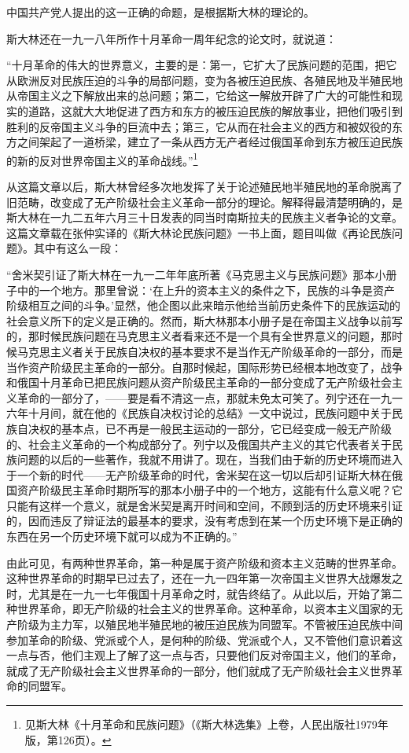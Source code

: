 \documentclass[UTF8, 12pt, a4paper]{ctexrep}
\begin{document}
中国共产党人提出的这一正确的命题，是根据斯大林的理论的。

斯大林还在一九一八年所作十月革命一周年纪念的论文时，就说道：

“十月革命的伟大的世界意义，主要的是：第一，它扩大了民族问题的范围，把它从欧洲反对民族压迫的斗争的局部问题，变为各被压迫民族、各殖民地及半殖民地从帝国主义之下解放出来的总问题；第二，它给这一解放开辟了广大的可能性和现实的道路，这就大大地促进了西方和东方的被压迫民族的解放事业，把他们吸引到胜利的反帝国主义斗争的巨流中去；第三，它从而在社会主义的西方和被奴役的东方之间架起了一道桥梁，建立了一条从西方无产者经过俄国革命到东方被压迫民族的新的反对世界帝国主义的革命战线。”\footnote{见斯大林《十月革命和民族问题》（《斯大林选集》上卷，人民出版社1979年版，第126页）。}

从这篇文章以后，斯大林曾经多次地发挥了关于论述殖民地半殖民地的革命脱离了旧范畴，改变成了无产阶级社会主义革命一部分的理论。解释得最清楚明确的，是斯大林在一九二五年六月三十日发表的同当时南斯拉夫的民族主义者争论的文章。这篇文章载在张仲实译的《斯大林论民族问题》一书上面，题目叫做《再论民族问题》。其中有这么一段：

“舍米契引证了斯大林在一九一二年年底所著《马克思主义与民族问题》那本小册子中的一个地方。那里曾说：‘在上升的资本主义的条件之下，民族的斗争是资产阶级相互之间的斗争。’显然，他企图以此来暗示他给当前历史条件下的民族运动的社会意义所下的定义是正确的。然而，斯大林那本小册子是在帝国主义战争以前写的，那时候民族问题在马克思主义者看来还不是一个具有全世界意义的问题，那时候马克思主义者关于民族自决权的基本要求不是当作无产阶级革命的一部分，而是当作资产阶级民主革命的一部分。自那时候起，国际形势已经根本地改变了，战争和俄国十月革命已把民族问题从资产阶级民主革命的一部分变成了无产阶级社会主义革命的一部分了，——要是看不清这一点，那就未免太可笑了。列宁还在一九一六年十月间，就在他的《民族自决权讨论的总结》一文中说过，民族问题中关于民族自决权的基本点，已不再是一般民主运动的一部分，它已经变成一般无产阶级的、社会主义革命的一个构成部分了。列宁以及俄国共产主义的其它代表者关于民族问题的以后的一些著作，我就不用讲了。现在，当我们由于新的历史环境而进入于一个新的时代——无产阶级革命的时代，舍米契在这一切以后却引证斯大林在俄国资产阶级民主革命时期所写的那本小册子中的一个地方，这能有什么意义呢？它只能有这样一个意义，就是舍米契是离开时间和空间，不顾到活的历史环境来引证的，因而违反了辩证法的最基本的要求，没有考虑到在某一个历史环境下是正确的东西在另一个历史环境下就可以成为不正确的。”

由此可见，有两种世界革命，第一种是属于资产阶级和资本主义范畴的世界革命。这种世界革命的时期早已过去了，还在一九一四年第一次帝国主义世界大战爆发之时，尤其是在一九一七年俄国十月革命之时，就告终结了。从此以后，开始了第二种世界革命，即无产阶级的社会主义的世界革命。这种革命，以资本主义国家的无产阶级为主力军，以殖民地半殖民地的被压迫民族为同盟军。不管被压迫民族中间参加革命的阶级、党派或个人，是何种的阶级、党派或个人，又不管他们意识着这一点与否，他们主观上了解了这一点与否，只要他们反对帝国主义，他们的革命，就成了无产阶级社会主义世界革命的一部分，他们就成了无产阶级社会主义世界革命的同盟军。
\end{document}
